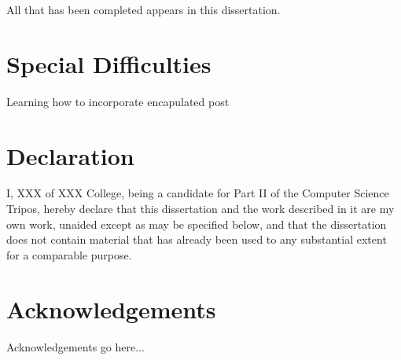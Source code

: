 \documentclass[12pt,a4paper,twoside,openright]{report}
\begin{document}
All that has been completed appears in this dissertation.

\section*{Special Difficulties}

Learning how to incorporate encapulated post


 
\newpage
\section*{Declaration}

I, XXX of XXX College, being a candidate for Part II of the Computer
Science Tripos, hereby declare
that this dissertation and the work described in it are my own work,
unaided except as may be specified below, and that the dissertation
does not contain material that has already been used to any substantial
extent for a comparable purpose.

\bigskip
{}

\medskip
{}


\tableofcontents

\listoffigures

\newpage

\section*{Acknowledgements}

Acknowledgements go here...


\pagestyle{headings}









\end{document}
